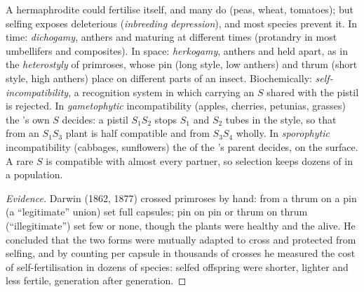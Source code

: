 \begin{proposition}\label{prop:b2:angiosperm-reproduction:selfing}
A hermaphrodite  could fertilise itself, and many do (peas,
wheat, tomatoes); but selfing exposes  deleterious 
(\emph{inbreeding depression}), and most species prevent it. In time:
\emph{dichogamy}, anthers and  maturing at different times
(protandry in most umbellifers and composites). In space:
\emph{herkogamy}, anthers and  held apart, as in the
\emph{heterostyly} of primroses, whose pin  (long style, low
anthers) and thrum  (short style, high anthers) place 
on different parts of an insect. Biochemically:
\emph{self-incompatibility}, a recognition system in which 
carrying an $S$  shared with the pistil is rejected. In
\emph{gametophytic} incompatibility (apples, cherries, petunias,
grasses) the 's own  $S$  decides: a pistil
$S_1S_2$ stops $S_1$ and $S_2$ tubes in the style, so that  from
an $S_1S_3$ plant is half compatible and from $S_3S_4$ wholly. In
\emph{sporophytic} incompatibility (cabbages, sunflowers) the
  of the 's parent decides, on the 
surface. A rare $S$  is compatible with almost every partner,
so selection keeps dozens of  in a population.
\end{proposition}
\begin{proof}[Evidence]
Darwin (1862, 1877) crossed primroses by hand:  from a thrum
 on a pin  (a ``legitimate'' union) set full capsules;
pin on pin or thrum on thrum (``illegitimate'') set few  or
none, though the plants were healthy and the  alive. He
concluded that the two forms were mutually adapted to cross and
protected from selfing, and by counting  per capsule in
thousands of crosses he measured the cost of self-fertilisation in
dozens of species: selfed offspring were shorter, lighter and less
fertile, generation after generation.
\end{proof}

